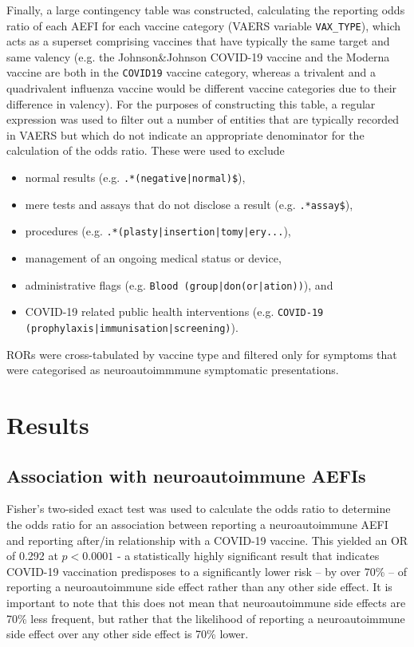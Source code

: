 \documentclass[idr,communication,submit,oneauthor,pdftex]{Definitions/mdpi}
\begin{document}
Finally, a large contingency table was constructed, calculating the reporting odds ratio of each AEFI for each vaccine
category (VAERS variable \texttt{VAX\_TYPE}), which acts as a superset comprising vaccines that have typically the same
target and same valency (e.g. the Johnson\&Johnson COVID-19 vaccine and the Moderna vaccine are both in the
\texttt{COVID19} vaccine category, whereas a trivalent and a quadrivalent influenza vaccine would be different vaccine
categories due to their difference in valency). For the purposes of constructing this table, a regular expression was
used to filter out a number of entities that are typically recorded in VAERS but which do not indicate an appropriate
denominator for the calculation of the odds ratio. These were used to exclude

\begin{itemize}
    \item normal results (e.g. \texttt{.*(negative|normal)\$}),
    \item mere tests and assays that do not disclose a result (e.g. \texttt{.*assay\$}),
    \item procedures (e.g. \texttt{.*(plasty|insertion|tomy|ery...}),
    \item management of an ongoing medical status or device,
    \item administrative flags (e.g. \texttt{Blood (group|don(or|ation))}), and
    \item COVID-19 related public health interventions (e.g. \texttt{COVID-19 \\ (prophylaxis|immunisation|screening)}).
\end{itemize}

RORs were cross-tabulated by vaccine type and filtered only for symptoms that were categorised as neuroautoimmmune
symptomatic presentations.

\section{Results}

\subsection{Association with neuroautoimmune AEFIs}

Fisher's two-sided exact test was used to calculate the odds ratio to determine the odds ratio for an association
between reporting a neuroautoimmune AEFI and reporting after/in relationship with a COVID-19 vaccine. This yielded an
OR of 0.292 at $p < 0.0001$ - a statistically highly significant result that indicates COVID-19 vaccination predisposes
to a significantly lower risk – by over 70\% – of reporting a neuroautoimmune side effect rather than any other side
effect. It is important to note that this does not mean that neuroautoimmune side effects are 70\% less frequent, but
rather that the likelihood of reporting a neuroautoimmune side effect over any other side effect is 70\% lower.
\end{document}
